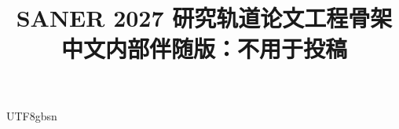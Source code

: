 \documentclass[10pt,conference]{IEEEtran}
\title{SANER 2027 研究轨道论文工程骨架\\中文内部伴随版：不用于投稿}
\begin{document}
\begin{CJK*}{UTF8}{gbsn}
\maketitle

\ifprintreferences
  
  
\fi
\end{CJK*}
\end{document}
